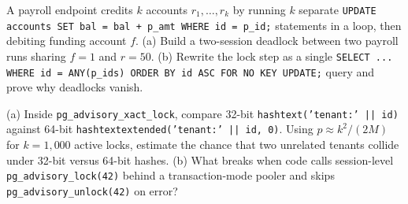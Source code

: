 \begin{exercise}
A payroll endpoint credits $k$ accounts $r_1, \dots, r_k$ by running $k$ separate \texttt{UPDATE accounts SET bal = bal + p\_amt WHERE id = p\_id;} statements in a loop, then debiting funding account $f$.
(a) Build a two-session deadlock between two payroll runs sharing $f = 1$ and $r = 50$.
(b) Rewrite the lock step as a single \texttt{SELECT ... WHERE id = ANY(p\_ids) ORDER BY id ASC FOR NO KEY UPDATE;} query and prove why deadlocks vanish.
\end{exercise}

\begin{exercise}
(a) Inside \texttt{pg\_advisory\_xact\_lock}, compare 32-bit \texttt{hashtext('tenant:' || id)} against 64-bit \texttt{hashtextextended('tenant:' || id, 0)}. Using $p \approx k^2 / (2M)$ for $k = 1{,}000$ active locks, estimate the chance that two unrelated tenants collide under 32-bit versus 64-bit hashes.
(b) What breaks when code calls session-level \texttt{pg\_advisory\_lock(42)} behind a transaction-mode pooler and skips \texttt{pg\_advisory\_unlock(42)} on error?
\end{exercise}
